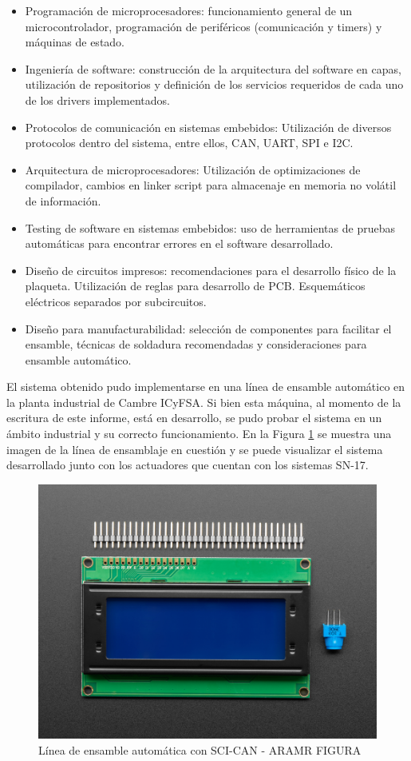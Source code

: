 \begin{itemize}
	\item Programación de microprocesadores: funcionamiento general de un microcontrolador, programación de periféricos (comunicación y timers) y máquinas de estado.
	\item Ingeniería de software: construcción de la arquitectura del software en capas, utilización de repositorios y definición de los servicios requeridos de cada uno de los drivers implementados.
	\item Protocolos de comunicación en sistemas embebidos: Utilización de diversos protocolos dentro del sistema, entre ellos, CAN, UART, SPI e I2C.
	\item Arquitectura de microprocesadores: Utilización de optimizaciones de compilador, cambios en linker script para almacenaje en memoria no volátil de información.
	\item Testing de software en sistemas embebidos: uso de herramientas de pruebas automáticas para encontrar errores en el software desarrollado.
	\item Diseño de circuitos impresos: recomendaciones para el desarrollo físico de la plaqueta. Utilización de reglas para desarrollo de PCB. Esquemáticos eléctricos separados por subcircuitos.
	\item Diseño para manufacturabilidad: selección de componentes para facilitar el ensamble, técnicas de soldadura recomendadas y consideraciones para ensamble automático.
\end{itemize}

El sistema obtenido pudo implementarse en una línea de ensamble automático en la planta industrial de Cambre ICyFSA. Si bien esta máquina, al momento de la escritura de este informe, está en desarrollo, se pudo probar el sistema en un ámbito industrial y su correcto funcionamiento. En la Figura \ref{fig:au-0037} se muestra una imagen de la línea de ensamblaje en cuestión y se puede visualizar el sistema desarrollado junto con los actuadores que cuentan con los sistemas SN-17.

\begin{figure}[htbp]
	\centering
	\includegraphics[scale=1]{./Figures/LCD.jpg}
	\caption{Línea de ensamble automática con SCI-CAN - ARAMR FIGURA}
	\label{fig:au-0037}
\end{figure}

